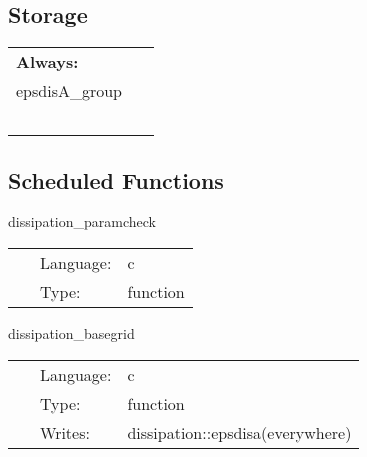 \subsection*{Storage}

\hspace{5mm}

 \begin{tabular*}{160mm}{ll} 

{\bf Always:}&  ~ \\ 
 epsdisA\_group & ~\\ 
~ & ~\\ 
\end{tabular*} 


\subsection*{Scheduled Functions}
\vspace{5mm}


\hspace{5mm} dissipation\_paramcheck 

\hspace{5mm}{\it check dissipation parameters for consistency } 


\hspace{5mm}

 \begin{tabular*}{160mm}{cll} 
~ & Language:  & c \\ 
~ & Type:  & function \\ 
\end{tabular*} 


\vspace{5mm}


\hspace{5mm} dissipation\_basegrid 

\hspace{5mm}{\it ensure that there are enough ghost zones } 


\hspace{5mm}

 \begin{tabular*}{160mm}{cll} 
~ & Language:  & c \\ 
~ & Type:  & function \\ 
~ & Writes:  & dissipation::epsdisa(everywhere) \\ 
\end{tabular*} 


